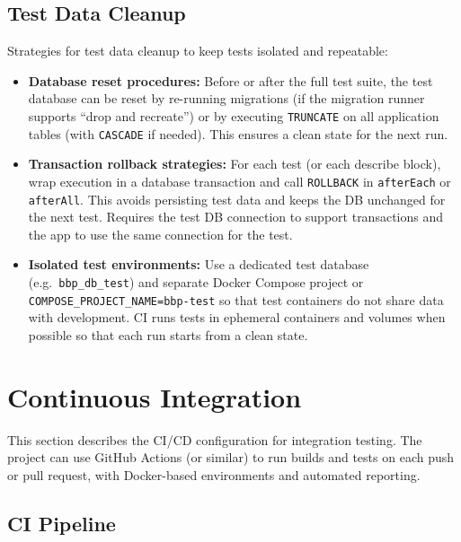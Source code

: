 \subsection{Test Data Cleanup}
\label{subsec:test_data_cleanup}%

Strategies for test data cleanup to keep tests isolated and repeatable:
\begin{itemize}
    \item \textbf{Database reset procedures:} Before or after the full test suite, the test database can be reset by re-running migrations (if the migration runner supports “drop and recreate”) or by executing \texttt{TRUNCATE} on all application tables (with \texttt{CASCADE} if needed). This ensures a clean state for the next run.
    \item \textbf{Transaction rollback strategies:} For each test (or each describe block), wrap execution in a database transaction and call \texttt{ROLLBACK} in \texttt{afterEach} or \texttt{afterAll}. This avoids persisting test data and keeps the DB unchanged for the next test. Requires the test DB connection to support transactions and the app to use the same connection for the test.
    \item \textbf{Isolated test environments:} Use a dedicated test database (e.g.\ \texttt{bbp\_db\_test}) and separate Docker Compose project or \texttt{COMPOSE\_PROJECT\_NAME=bbp-test} so that test containers do not share data with development. CI runs tests in ephemeral containers and volumes when possible so that each run starts from a clean state.
\end{itemize}

\section{Continuous Integration}
\label{sec:continuous_integration}%

This section describes the CI/CD configuration for integration testing. The project can use GitHub Actions (or similar) to run builds and tests on each push or pull request, with Docker-based environments and automated reporting.

\subsection{CI Pipeline}
\label{subsec:ci_pipeline}%

